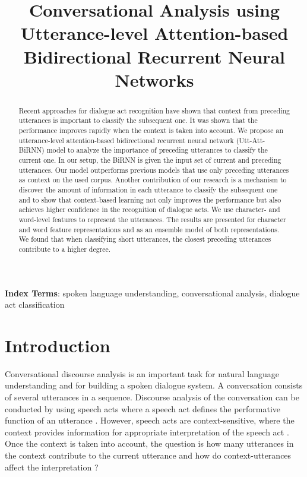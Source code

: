 \documentclass[a4paper]{article}
\title{Conversational Analysis using Utterance-level Attention-based Bidirectional Recurrent Neural Networks}\name{Chandrakant Bothe, Sven Magg, Cornelius Weber and Stefan Wermter}
\begin{document}
\maketitle

\begin{abstract}
Recent approaches for dialogue act recognition have shown that context from preceding utterances is important to classify the subsequent one. 
It was shown that the performance improves rapidly when the context is taken into account. 
We propose an utterance-level attention-based bidirectional recurrent neural network (Utt-Att-BiRNN) model to analyze the importance of preceding utterances to classify the current one. 
In our setup, the BiRNN is given the input set of current and preceding utterances. 
Our model outperforms previous models that use only preceding utterances as context on the used corpus. 
Another contribution of our research is a mechanism to discover the amount of information in each utterance to classify the subsequent one and to show that context-based learning not only improves the performance but also achieves higher confidence in the recognition of dialogue acts. 
We use character- and word-level features to represent the utterances.
The results are presented for character and word feature representations and as an ensemble model of both representations. 
We found that when classifying short utterances, the closest preceding utterances contribute to a higher degree. 

\end{abstract}

\noindent\textbf{Index Terms}: spoken language understanding, conversational analysis, dialogue act classification


\section{Introduction}

Conversational discourse analysis is an important task for natural language understanding and for building a spoken dialogue system. 
A conversation consists of several utterances in a sequence. 
Discourse analysis of the conversation can be conducted by using speech acts where a speech act defines the performative function of an utterance \cite{austin1962things}.
However, speech acts are context-sensitive, where the context provides information for appropriate interpretation of the speech act \cite{sbisa2002speech}. Once the context is taken into account, the question is how many utterances in the context contribute to the current utterance and how do context-utterances affect the interpretation \cite{austin1962things,sbisa2002speech,searle1979,wermter1996learning}?
\end{document}
